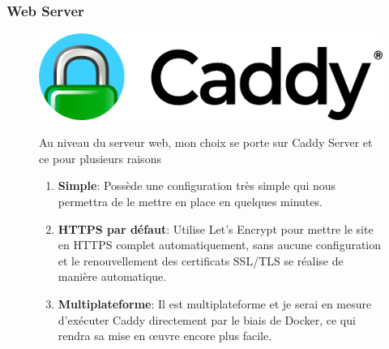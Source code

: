 \subsubsection{Web Server}

\begin{figure}[H]
  \begin{minipage}{.3\textwidth}
    \includegraphics[width=0.75\linewidth]{img/caddy.png} 
  \end{minipage} 
  \begin{minipage}{.7\textwidth}
    Au niveau du serveur web, mon choix se porte sur Caddy Server et ce pour plusieurs raisons
    \begin{enumerate}
      \item \textbf{Simple}: Possède une configuration très simple qui nous permettra de le mettre en place en quelques minutes.
      \item \textbf{HTTPS par défaut}: Utilise Let's Encrypt pour mettre le site en HTTPS complet automatiquement, sans aucune configuration et le renouvellement des certificats SSL/TLS se réalise de manière automatique.
      \item \textbf{Multiplateforme}: Il est multiplateforme et je serai en mesure d'exécuter Caddy directement par le biais de Docker, ce qui rendra sa mise en œuvre encore plus facile.
    \end{enumerate}
  \end{minipage} 
\end{figure}

